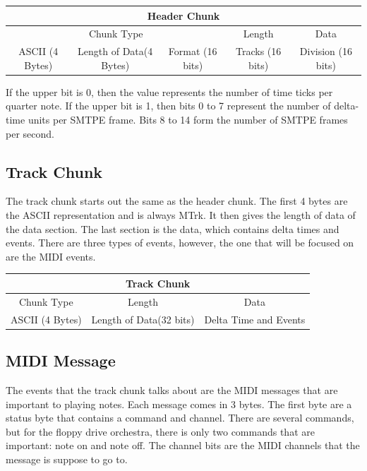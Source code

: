 \documentclass[11pt, a4paper]{report}
\begin{document}
\label{fig:header}
\begin{center}
 \begin{tabular}{||c | c | c | c | c||} 
 \hline
  \multicolumn{5}{|c|}{Header Chunk} \\ 
 \hline
  \multicolumn{3}{|c|}{Chunk Type}  & Length & Data \\
 \hline
  ASCII (4 Bytes) & Length of Data(4 Bytes)  & Format (16 bits) & Tracks (16 bits) & Division (16 bits) \\
 
 \hline
\end{tabular}
\end{center}

If the upper bit is 0, then the value represents the number of time ticks per quarter note. If the upper bit is 1, then bits 0 to 7 represent the number of delta-time units per SMTPE frame. Bits 8 to 14 form the number of SMTPE frames per second. \\

\subsection{Track Chunk}

The track chunk starts out the same as the header chunk. The first 4 bytes are the ASCII representation and is always MTrk. It then gives the length of data of the data section. The last section is the data, which contains delta times and events. There are three types of events, however, the one that will be focused on are the MIDI events.


\label{fig:track}
\begin{center}
 \begin{tabular}{||c | c | c||} 
 \hline
  \multicolumn{3}{|c|}{Track Chunk} \\ 
 \hline
  Chunk Type & Length & Data \\
 \hline
  ASCII (4 Bytes) & Length of Data(32 bits)  &  Delta Time and Events \\
 
 \hline
\end{tabular}
\end{center}


\subsection{MIDI Message}

The events that the track chunk talks about are the MIDI messages that are important to playing notes. Each message comes in 3 bytes. The first byte are a status byte that contains a command and channel. There are several commands, but for the floppy drive orchestra, there is only two commands that are important: note on and note off. The channel bits are the MIDI channels that the message is suppose to go to. \\
\end{document}
